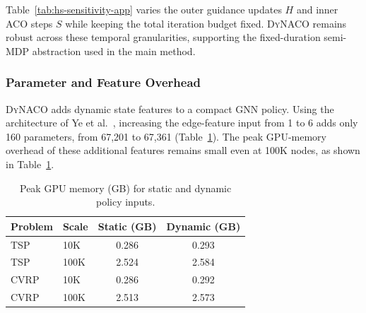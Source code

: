 \documentclass[sigconf]{acmart}
\newcommand{\DyNACO}{\textsc{DyNACO}}
\begin{document}
Table~\ref{tab:hs-sensitivity-app} varies the outer guidance updates $H$ and inner ACO steps $S$ while keeping the total iteration budget fixed.
\DyNACO{} remains robust across these temporal granularities, supporting the fixed-duration semi-MDP abstraction used in the main method.




\subsubsection{Parameter and Feature Overhead}

\DyNACO{} adds dynamic state features to a compact GNN policy.
Using the architecture of Ye et al.~\cite{deepaco}, increasing the edge-feature input from 1 to 6 adds only 160 parameters, from 67,201 to 67,361 (Table~\ref{tab:feature-memory-app}).
The peak GPU-memory overhead of these additional features remains small even at 100K nodes, as shown in Table~\ref{tab:feature-memory-app}.

\begin{table}[t]
\centering
\caption{Peak GPU memory (GB) for static and dynamic policy inputs.}
\label{tab:feature-memory-app}
\small
\renewcommand{\arraystretch}{0.85}
\begin{tabular*}{\columnwidth}{@{\extracolsep{\fill}}llcc@{}}
\toprule
Problem & Scale & Static (GB) & Dynamic (GB) \\
\midrule
TSP & 10K & 0.286 & 0.293 \\
TSP & 100K & 2.524 & 2.584 \\
CVRP & 10K & 0.286 & 0.292 \\
CVRP & 100K & 2.513 & 2.573 \\
\bottomrule
\end{tabular*}
\end{table}
\end{document}
